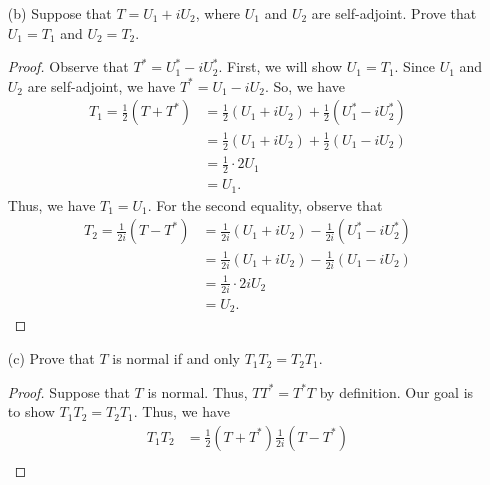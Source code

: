 \begin{enumerate}
\begin{proof}
        \end{proof}
    \item[(b)] Suppose that \( T = {U}_{1} + i {U}_{2} \), where \( {U}_{1} \) and \( {U}_{2} \) are self-adjoint. Prove that \( {U}_{1} = {T}_{1} \) and \( {U}_{2} = {T}_{2} \).
        \begin{proof}
            Observe that \( T^{*} = {U}_{1}^{*} - i {U}_{2}^{*} \). First, we will show \( {U}_{1} = {T}_{1} \). Since \( {U}_{1}  \) and \( {U}_{2} \) are self-adjoint, we have \( T^{*} = {U}_{1} - i {U}_{2} \). So, we have
            \begin{align*}
                {T}_{1} = \frac{ 1 }{ 2 }  (T + T^{*})  &= \frac{ 1 }{ 2 }  ({U}_{1} + i {U}_{2}) + \frac{ 1 }{ 2 }  ({U}_{1}^{*} - i {U}_{2}^{*}) \\
                                                        &=\frac{ 1 }{ 2 }  ({U}_{1} + i {U}_{2}) + \frac{ 1 }{ 2 } ( {U}_{1} - i {U}_{2}) \\
                                                        &= \frac{ 1 }{ 2 }  \cdot 2 {U}_{1} \\
                                                        &=  {U}_{1}.
\end{align*}
Thus, we have \( {T}_{1} = {U}_{1} \). For the second equality, observe that
\begin{align*}
    {T}_{2} = \frac{ 1 }{ 2i }  (T - T^{*}) &= \frac{ 1 }{ 2i } ( {U}_{1} + i {U}_{2}) - \frac{ 1 }{ 2i } ( {U}_{1}^{*} - i {U}_{2}^{*} )  \\
                                            &= \frac{ 1 }{ 2i }  ({U}_{1} + i {U}_{2}) - \frac{ 1  }{ 2i }  ({U}_{1} - i {U}_{2}) \\
                                            &= \frac{ 1 }{ 2i } \cdot 2i {U}_{2} \\
                                            &= {U}_{2}.
\end{align*}
        \end{proof}
    \item[(c)] Prove that \( T  \) is normal if and only \( {T}_{1} {T}_{2} = {T}_{2} {T}_{1} \).
        \begin{proof}
        Suppose that \( T  \) is normal. Thus, \( T T^{*} = T^{*} T  \) by definition. Our goal is to show \( {T}_{1} {T}_{2}  = {T}_{2} {T}_{1} \). Thus, we have
        \begin{align*}
            {T}_{1} {T}_{2} &= \frac{ 1 }{ 2 }  (T  + T^{*}) \frac{ 1 }{ 2i }  (T - T^{*})  \\

\end{align*}
\end{proof}
\end{enumerate}
